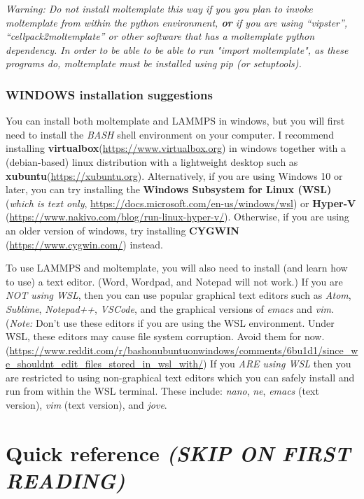 \documentclass[11pt]{article}
\begin{document}
\textit{Warning:
  Do not install moltemplate this way if you you plan to invoke moltemplate
from within the python environment, \textbf{or} if you are using ``vipster'',
``cellpack2moltemplate'' or other software that has a moltemplate python
dependency.  In order to be able to be able to run "import moltemplate",
as these programs do, moltemplate must be installed using pip (or setuptools).}


\subsubsection*{WINDOWS installation suggestions}

You can install both moltemplate and LAMMPS in windows,
but you will first need to install the \textit{BASH}
shell environment on your computer.  I recommend installing
\textbf{virtualbox}(\url{https://www.virtualbox.org}) in windows together
with a (debian-based) linux distribution with a lightweight desktop such as
\textbf{xubuntu}(\url{https://xubuntu.org}).
Alternatively, if you are using Windows 10 or later, you can try installing the
\textbf{Windows Subsystem for Linux (WSL)}
(\textit{which is text only},
 \url{https://docs.microsoft.com/en-us/windows/wsl})
or
\textbf{Hyper-V}
(\url{https://www.nakivo.com/blog/run-linux-hyper-v/}).
Otherwise, if you are using an older version of windows, try installing
\textbf{CYGWIN}
(\url{https://www.cygwin.com/}) instead.

To use LAMMPS and moltemplate, you will also need to install (and learn
how to use) a text editor.  (Word, Wordpad, and Notepad will not work.)
If you are \textit{NOT using WSL}, then you 
can use popular graphical text editors such as
\textit{Atom}, \textit{Sublime},
\textit{Notepad++}, \textit{VSCode},
and the graphical versions of \textit{emacs} and \textit{vim}.
(\textit{Note:} Don't use these editors if you are using the WSL environment.
Under WSL, these editors may cause file system corruption.
Avoid them for now. (\url{https://www.reddit.com/r/bashonubuntuonwindows/comments/6bu1d1/since_we_shouldnt_edit_files_stored_in_wsl_with/})
If you \textit{ARE using WSL} then you are restricted to using
non-graphical text editors which you can safely install and
run from within the WSL terminal.
These include: \textit{nano}, \textit{ne},
\textit{emacs} (text version),
\textit{vim} (text version), and \textit{jove}.


\pagebreak
\section{Quick reference \textit{(SKIP ON FIRST READING)}}
\end{document}
